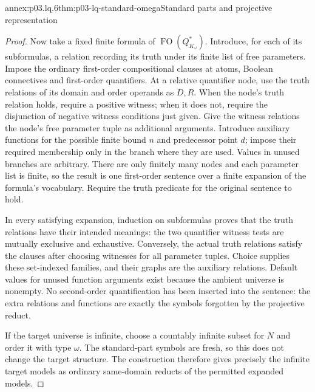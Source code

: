 \begin{annexitem}{annex:p03.lq.6}{thm:p03-lq-standard-omega}{Standard parts and projective representation}
\begin{proof}
Now take a fixed finite formula of
\(\operatorname{FO}(Q_{K_\omega}^*)\). Introduce, for each of
its subformulas, a relation recording its truth under its finite
list of free parameters. Impose the ordinary first-order
compositional clauses at atoms, Boolean connectives and
first-order quantifiers. At a relative quantifier node, use the
truth relations of its domain and order operands as \(D,R\).
When the node's truth relation holds, require a positive witness;
when it does not, require the disjunction of negative witness
conditions just given. Give the witness relations the node's
free parameter tuple as additional arguments. Introduce auxiliary
functions for the possible finite bound \(n\) and predecessor
point \(d\); impose their required membership only in the branch
where they are used. Values in unused branches are arbitrary.
There are only finitely many nodes and each parameter list is
finite, so the result is one first-order sentence over a finite
expansion of the formula's vocabulary. Require the truth predicate
for the original sentence to hold.

In every satisfying expansion, induction on subformulas proves
that the truth relations have their intended meanings: the two
quantifier witness tests are mutually exclusive and exhaustive.
Conversely, the actual truth relations satisfy the clauses after
choosing witnesses for all parameter tuples. Choice supplies these
set-indexed families, and their graphs are the auxiliary relations.
Default values for unused function arguments exist because the
ambient universe is nonempty. No second-order quantification has
been inserted into the sentence: the extra relations and functions
are exactly the symbols forgotten by the projective reduct.

If the target universe is infinite, choose a countably infinite
subset for \(N\) and order it with type \(\omega\). The
standard-part symbols are fresh, so this does not change the
target structure. The construction therefore gives precisely the
infinite target models as ordinary same-domain reducts of the
permitted expanded models.


\end{proof}
\end{annexitem}
